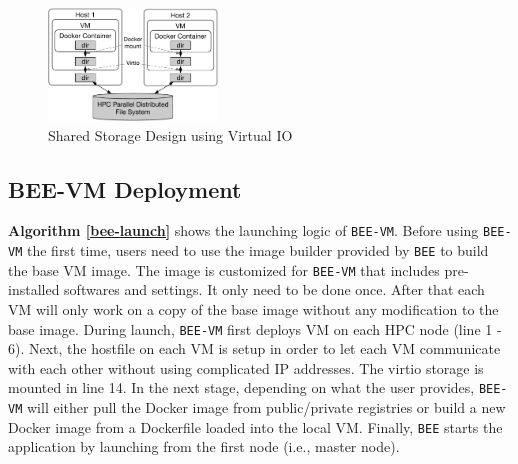 
\begin{figure}[h]
    \centering
    \includegraphics[width=0.4\textwidth]{figures/virtio.pdf}
    \caption{Shared Storage Design using Virtual IO}
    \label{bee-vm}
    \vspace*{-1em}
\end{figure}




\subsection{BEE-VM Deployment}
\textbf{Algorithm \ref{bee-launch}} shows the launching logic of \texttt{BEE-VM}. Before using \texttt{BEE-VM} the first time, users need to use the image builder provided by \texttt{BEE} to build the base VM image. The image is customized for \texttt{BEE-VM} that includes pre-installed softwares and settings. It only need to be done once. After that each VM will only work on a copy of the base image without any modification to the base image. During launch, \texttt{BEE-VM} first deploys VM on each HPC node (line 1 - 6). Next, the hostfile on each VM is setup in order to let each VM communicate with each other without using complicated IP addresses. The virtio storage is mounted in line 14. In the next stage, depending on what the user provides, \texttt{BEE-VM} will either pull the Docker image from public/private registries or build a new Docker image from a Dockerfile loaded into the local VM. Finally, \texttt{BEE} starts the application by launching from the first node (i.e., master node).


